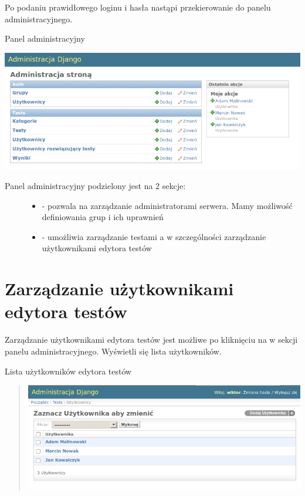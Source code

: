 \documentclass[letterpaper,10pt,polish]{sphinxmanual}
\begin{document}
Po podaniu prawidłowego loginu i hasła nastąpi przekierowanie do panelu administracyjnego.

Panel administracyjny

\includegraphics{Administracja.png}
\begin{description}
\item[{Panel administracyjny podzielony jest na 2 sekcje:}] \leavevmode\begin{itemize}
\item {} 
 - pozwala na zarządzanie administratorami serwera. Mamy możliwość definiowania grup i ich uprawnień

\item {} 
 - umożliwia zarządzanie testami a w szczególności zarządzanie użytkownikami edytora testów

\end{itemize}

\end{description}


\section{Zarządzanie użytkownikami edytora testów}
\label{index:zarzadzanie-uzytkownikami}\label{index:zarzadzanie-uzytkownikami-edytora-testow}
Zarządzanie użytkownikami edytora testów jest możliwe po kliknięciu na  w sekcji  panelu administracyjnego. Wyświetli się lista użytkowników.

Lista użytkowników edytora testów
\begin{quote}

\includegraphics{ListaUzytkownikow.png}
\end{quote}
\end{document}
